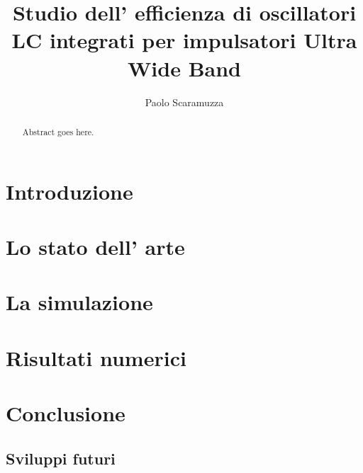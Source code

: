 \documentclass[a4paper]{memoir}
\author{Paolo Scaramuzza}
\title{Studio dell' efficienza di oscillatori LC integrati per impulsatori 
	Ultra Wide Band}
\date{} %
\begin{document}
\cleardoublepage
\newpage

\begin{vplace}[0.7]
\begin{abstract}
Abstract goes here.
\end{abstract}
\end{vplace}

\cleardoublepage
\newpage
\tableofcontents

\cleardoublepage
\chapter{Introduzione}

\cleardoublepage
\chapter{Lo stato dell' arte}

\cleardoublepage
\chapter{La simulazione}
\cite{Razavi11}
\cleardoublepage
\chapter{Risultati numerici}

\cleardoublepage
\chapter{Conclusione}

\section{Sviluppi futuri}



\end{document}
